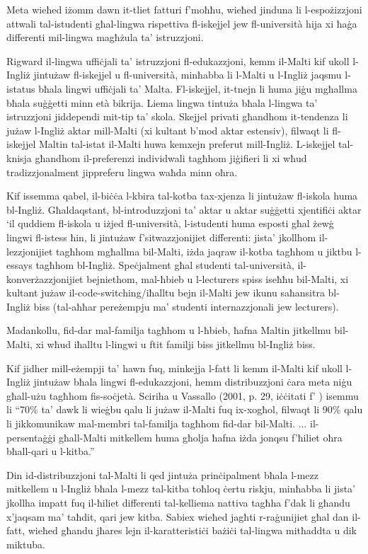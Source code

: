 \documentclass[]{../../metanetpaper}
\begin{document}
\begin{multicols}{2}
Meta wieħed iżomm dawn it-tliet fatturi f’moħħu, wieħed jinduna  li l-espożizzjoni attwali tal-istudenti għal-lingwa rispettiva fl-iskejjel jew fl-università hija xi ħaġa differenti mil-lingwa magħżula ta’ istruzzjoni.

Rigward il-lingwa uffiċjali ta’ istruzzjoni fl-edukazzjoni, kemm il-Malti kif ukoll l-Ingliż jintużaw fl-iskejjel u fl-università, minħabba li l-Malti u l-Ingliż jaqsmu l-istatus bħala lingwi uffiċjali ta’ Malta. Fl-iskejjel, it-tnejn li huma jiġu mgħallma bħala suġġetti minn età bikrija. Liema lingwa tintuża bħala l-lingwa ta’ istruzzjoni jiddependi mit-tip ta’ skola. Skejjel privati għandhom it-tendenza li jużaw l-Ingliż aktar mill-Malti (xi kultant b’mod aktar estensiv), filwaqt li fl-iskejjel Maltin tal-istat il-Malti huwa kemxejn preferut mill-Ingliż. L-iskejjel tal-knisja għandhom il-preferenzi individwali tagħhom jiġifieri li xi wħud tradizzjonalment jippreferu lingwa waħda minn oħra.

Kif issemma qabel, il-biċċa l-kbira tal-kotba tax-xjenza li jintużaw fl-iskola huma bl-Ingliż. Għaldaqstant, bl-introduzzjoni ta’ aktar u aktar suġġetti xjentifiċi aktar ‘il quddiem fl-iskola u iżjed fl-università, l-istudenti huma esposti għal żewġ lingwi fl-istess ħin, li jintużaw f'sitwazzjonijiet differenti: jista’ jkollhom il-lezzjonijiet tagħhom mgħallma bil-Malti, iżda jaqraw il-kotba tagħhom u jiktbu l-essays tagħhom bl-Ingliż. Speċjalment għal studenti tal-università, il-konverżazzjonijiet bejniethom, mal-ħbieb u l-lecturers spiss iseħħu bil-Malti, xi kultant jużaw il-code-switching/iħalltu bejn il-Malti jew ikunu saħansitra bl-Ingliż biss (tal-aħħar pereżempju ma’ studenti internazzjonali jew lecturers).

Madankollu, fid-dar mal-familja tagħhom u l-ħbieb, ħafna Maltin jitkellmu bil-Malti, xi wħud iħalltu l-lingwi u ftit familji biss jitkellmu bl-Ingliż biss.

Kif jidher mill-eżempji ta’ hawn fuq, minkejja l-fatt li kemm il-Malti kif ukoll l-Ingliż jintużaw bħala lingwi fl-edukazzjoni, hemm distribuzzjoni ċara meta niġu għall-użu tagħhom fis-soċjetà. Sciriha u Vassallo (2001, p. 29, iċċitati f’ \cite{Fabri:2011a}) isemmu li ``70\% ta’ dawk li wieġbu qalu li jużaw il-Malti fuq ix-xogħol, filwaqt li 90\% qalu li jikkomunikaw mal-membri tal-familja tagħhom fid-dar bil-Malti. ... il-persentaġġi għall-Malti mitkellem huma għolja ħafna iżda jonqsu f’ħiliet oħra bħall-qari u l-kitba.'' 

Din id-distribuzzjoni tal-Malti li qed jintuża prinċipalment bħala l-mezz mitkellem u l-Ingliż bħala l-mezz tal-kitba toħloq ċertu riskju, minħabba li jista’ jkollha impatt fuq il-ħiliet differenti tal-kelliema nattiva tagħha f’dak li għandu x’jaqsam ma’ taħdit, qari jew kitba. Sabiex wieħed jagħti r-raġunijiet għal dan il-fatt, wieħed għandu jħares lejn il-karatteristiċi bażiċi tal-lingwa mitħaddta u dik miktuba.


\end{multicols}
\end{document}
